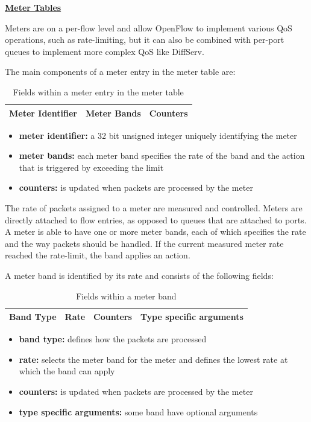 \underline{\textbf{Meter Tables}}

Meters are on a per-flow level and allow OpenFlow to implement various QoS operations, such as rate-limiting, but it can also be combined with per-port queues to implement more complex QoS like DiffServ.

The main components of a meter entry in the meter table are:

\begin{table}[H]
\centering

\begin{tabular}{|c|c|c|}
\hline Meter Identifier & Meter Bands & Counters \\ 
\hline 
\end{tabular} 

\caption{Fields within a meter entry in the meter table}
\end{table}

\begin{itemize}
\item \textbf{meter identifier:} a 32 bit unsigned integer uniquely identifying the meter
\item \textbf{meter bands:} each meter band specifies the rate of the band and the action that is triggered by exceeding the limit
\item \textbf{counters:} is updated when packets are processed by the meter
\end{itemize}

The rate of packets assigned to a meter are measured and controlled. Meters are directly attached to flow entries, as opposed to queues that are attached to ports. A meter is able to have one or more meter bands, each of which specifies the rate and the way packets should be handled. If the current measured meter rate reached the rate-limit, the band applies an action. 

A meter band is identified by its rate and consists of the following fields:

\begin{table}[H]
\centering

\begin{tabular}{|c|c|c|c|}
\hline Band Type & Rate & Counters & Type specific arguments \\ 
\hline 
\end{tabular} 

\caption{Fields within a meter band}
\end{table}

\begin{itemize}
\item \textbf{band type:} defines how the packets are processed
\item \textbf{rate:} selects the meter band for the meter and defines the lowest rate at which the band can apply
\item \textbf{counters:} is updated when packets are processed by the meter
\item \textbf{type specific arguments:} some band have optional arguments
\end{itemize}

